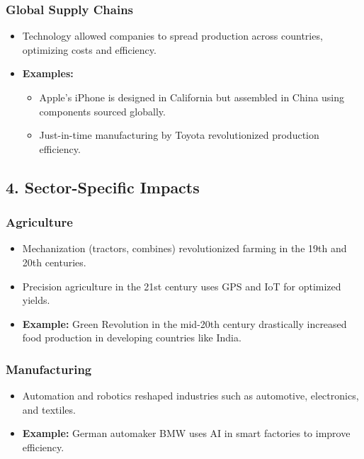 \documentclass{article}
\begin{document}
\subsubsection*{ Global Supply Chains}
\begin{itemize}
    \item Technology allowed companies to spread production across countries, optimizing costs and efficiency.
    \item \textbf{Examples:}
    \begin{itemize}
        \item Apple's iPhone is designed in California but assembled in China using components sourced globally.
        \item Just-in-time manufacturing by Toyota revolutionized production efficiency.
    \end{itemize}
\end{itemize}

\subsection*{4. Sector-Specific Impacts}

\subsubsection*{Agriculture}
\begin{itemize}
    \item Mechanization (tractors, combines) revolutionized farming in the 19th and 20th centuries.
    \item Precision agriculture in the 21st century uses GPS and IoT for optimized yields.
    \item \textbf{Example:} Green Revolution in the mid-20th century drastically increased food production in developing countries like India.
\end{itemize}

\subsubsection*{ Manufacturing}
\begin{itemize}
    \item Automation and robotics reshaped industries such as automotive, electronics, and textiles.
    \item \textbf{Example:} German automaker BMW uses AI in smart factories to improve efficiency.
\end{itemize}
\end{document}
